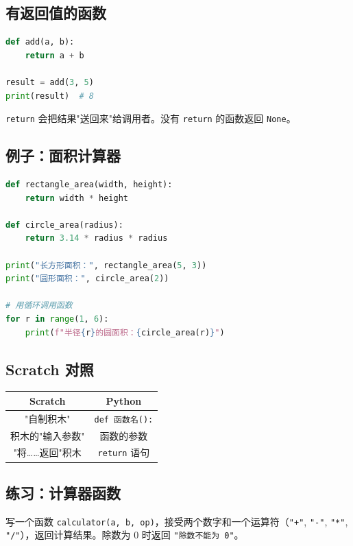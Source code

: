 \documentclass[a4paper,12pt]{ctexart}
\begin{document}
\subsection*{有返回值的函数}

\begin{lstlisting}[language=Python]
def add(a, b):
    return a + b

result = add(3, 5)
print(result)  # 8
\end{lstlisting}

\texttt{return} 会把结果"送回来"给调用者。没有 \texttt{return} 的函数返回 \texttt{None}。

\subsection*{例子：面积计算器}

\begin{lstlisting}[language=Python]
def rectangle_area(width, height):
    return width * height

def circle_area(radius):
    return 3.14 * radius * radius

print("长方形面积：", rectangle_area(5, 3))
print("圆形面积：", circle_area(2))

# 用循环调用函数
for r in range(1, 6):
    print(f"半径{r}的圆面积：{circle_area(r)}")
\end{lstlisting}

\subsection*{Scratch 对照}

\begin{center}
\begin{tabular}{|c|c|}
\hline
\textbf{Scratch} & \textbf{Python} \\ \hline
"自制积木" & \texttt{def 函数名():} \\ \hline
积木的"输入参数" & 函数的参数 \\ \hline
"将……返回"积木 & \texttt{return} 语句 \\ \hline
\end{tabular}
\end{center}

\subsection*{练习：计算器函数}

写一个函数 \texttt{calculator(a, b, op)}，接受两个数字和一个运算符（\texttt{"+"}, \texttt{"-"}, \texttt{"*"}, \texttt{"/"}），返回计算结果。除数为 0 时返回 \texttt{"除数不能为 0"}。
\end{document}
